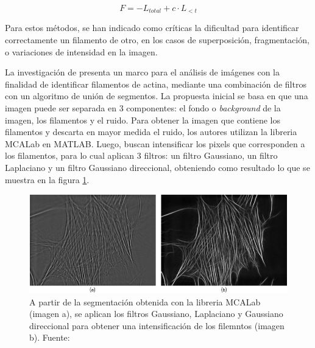 \begin{equation}
   \label{eq:FFunction}
    F = -L_{total} + {c}\cdot L_{<t} 
\end{equation}


Para estos m\'etodos, se han indicado como cr\'iticas la dificultad para identificar correctamente un filamento de otro, en los casos de  superposici\'on, fragmentaci\'on, o variaciones de intensidad en la imagen.


\smallskip
La investigaci\'on de \cite{alioscha2016robust} presenta un marco para el an\'alisis de im\'agenes con la finalidad de identificar filamentos de actina, mediante una combinaci\'on de filtros con un algoritmo de uni\'on de segmentos. La propuesta inicial se basa en que una imagen puede ser separada en 3 componentes: el fondo o {\it background} de la imagen, los filamentos y el ruido. Para obtener la imagen que contiene los filamentos y descarta en mayor medida el ruido, los autores utilizan la libreria MCALab en MATLAB. Luego, buscan intensificar los pixels que corresponden a los filamentos, para lo cual aplican 3 filtros: un filtro Gaussiano, un filtro Laplaciano y un filtro Gaussiano direccional, obteniendo como resultado lo que se muestra en la figura \ref{fig:AlioshaRobust}.

\begin{figure}[t]
    \centering
    \includegraphics[scale=2]{imagenes/Aliosha2016-GaussLaplFilters.jpg}
    \caption{A partir de la segmentaci\'on obtenida con la libreria MCALab (imagen a), se aplican los filtros Gaussiano, Laplaciano y Gaussiano direccional para obtener una intensificaci\'on de los filemntos (imagen b). Fuente: \cite{alioscha2016robust}}
    \label{fig:AlioshaRobust}
\end{figure}

